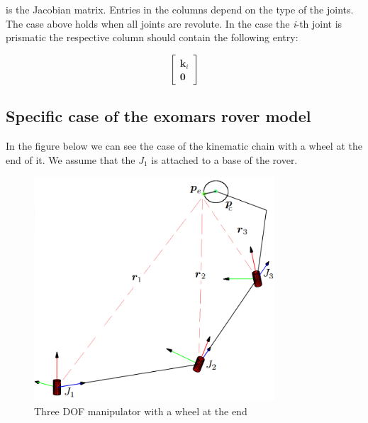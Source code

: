 \documentclass[a4paper]{article}
\begin{document}
\noindent is the Jacobian matrix. Entries in the columns depend on the type of the joints. The case above holds when all joints are revolute. In the case the \textit{i}-th joint is prismatic
the respective column should contain the following entry:

\[
\begin{bmatrix}
       \boldsymbol{k}_{i} \\
       \boldsymbol{0}             
\end{bmatrix}      
\]

\subsection{Specific case of the exomars rover model}

\noindent In the figure below we can see the case of the kinematic chain with a wheel at the end of it. We assume that the $J_{1}$ is attached to a base of the rover.  

\begin{figure}[h!]
  \centering
    \includegraphics[width=0.8\textwidth]{newjacobian}
  \caption{Three DOF manipulator with a wheel at the end}
\end{figure}
\end{document}
